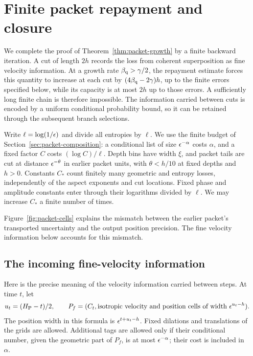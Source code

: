 \section{Finite packet repayment and closure}
\label{sec:packet-repayment}

We complete the proof of Theorem~\ref{thm:packet-growth} by a finite
backward iteration. A cut of length $2h$ records the loss from coherent
superposition as fine velocity information. At a growth rate
$\beta_{\mathrm q}>\gamma/2$, the repayment estimate forces this quantity to
increase at each cut by $(4\beta_{\mathrm q}-2\gamma)h$, up to the finite errors
specified below, while its capacity is at most $2h$ up to those errors.
A sufficiently long finite chain is therefore impossible.
The information carried between cuts is encoded by a uniform
conditional probability bound, so it can be retained through the
subsequent branch selections.

Write \(\ell=\log(1/\epsilon)\) and divide all entropies by \(\ell\).
We use the finite budget of Section~\ref{sec:packet-composition}:
a conditional list of size \(\epsilon^{-\alpha}\) costs \(\alpha\),
and a fixed factor \(C\) costs \((\log C)/\ell\).  Depth bins have
width \(\xi\), and packet tails are cut at distance \(\epsilon^{-\theta}\)
in earlier packet units, with \(\theta<h/10\) at fixed depths and
\(h>0\).  Constants \(C_*\) count finitely many geometric and
entropy losses, independently of the aspect exponents and cut
locations.  Fixed phase and amplitude constants enter through
their logarithms divided by \(\ell\).  We may increase \(C_*\)
a finite number of times.

Figure~\ref{fig:packet-cells} explains the mismatch between the earlier
packet's transported uncertainty and the output position precision.
The fine velocity information below accounts for this mismatch.


\subsection{The incoming fine-velocity information}

Here is the precise meaning of the velocity information carried between
steps.  At time \(t\), let
\[
 u_t=(H_{\mathrm P}-t)/2,\qquad
 P_f=(C_t,\text{isotropic velocity and position cells of width }
                  \epsilon^{u_t-h}).
\]
The position width in this formula is \(\epsilon^{t+u_t-h}\).
Fixed dilations and translations of the grids are allowed.  Additional
tags are allowed only if their conditional number, given the geometric
part of \(P_f\), is at most \(\epsilon^{-\alpha}\); their cost is included
in \(\alpha\).


